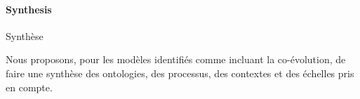 \paragraph{Synthesis}{Synthèse}

Nous proposons, pour les modèles identifiés comme incluant la co-évolution, de faire une synthèse des ontologies, des processus, des contextes et des échelles pris en compte.








\stars



